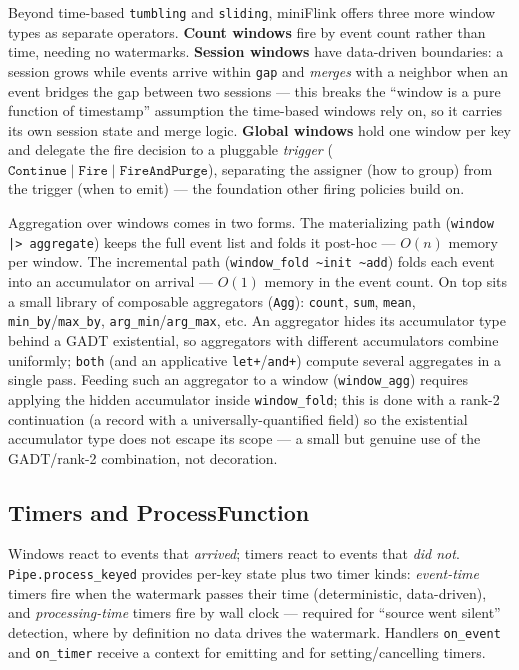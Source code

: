 \documentclass[11pt,a4paper]{article}
\begin{document}
Beyond time-based \texttt{tumbling} and \texttt{sliding}, miniFlink
offers three more window types as separate operators. \textbf{Count
windows} fire by event count rather than time, needing no watermarks.
\textbf{Session windows} have data-driven boundaries: a session grows
while events arrive within \texttt{gap} and \emph{merges} with a
neighbor when an event bridges the gap between two sessions — this
breaks the ``window is a pure function of timestamp'' assumption the
time-based windows rely on, so it carries its own session state and
merge logic. \textbf{Global windows} hold one window per key and
delegate the fire decision to a pluggable \emph{trigger}
($\mathtt{Continue} \mid \mathtt{Fire} \mid \mathtt{FireAndPurge}$),
separating the assigner (how to group) from the trigger (when to emit)
— the foundation other firing policies build on.

Aggregation over windows comes in two forms. The materializing path
(\texttt{window |> aggregate}) keeps the full event list and folds it
post-hoc — $O(n)$ memory per window. The incremental path
(\texttt{window\_fold \textasciitilde{}init \textasciitilde{}add})
folds each event into an accumulator on arrival — $O(1)$ memory in the
event count. On top sits a small library of composable aggregators
(\texttt{Agg}): \texttt{count}, \texttt{sum}, \texttt{mean},
\texttt{min\_by}/\texttt{max\_by}, \texttt{arg\_min}/\texttt{arg\_max},
etc. An aggregator hides its accumulator type behind a GADT
existential, so aggregators with different accumulators combine
uniformly; \texttt{both} (and an applicative \texttt{let+}/\texttt{and+})
compute several aggregates in a single pass. Feeding such an aggregator
to a window (\texttt{window\_agg}) requires applying the hidden
accumulator inside \texttt{window\_fold}; this is done with a rank-2
continuation (a record with a universally-quantified field) so the
existential accumulator type does not escape its scope — a small but
genuine use of the GADT/rank-2 combination, not decoration.

\subsection{Timers and ProcessFunction}

Windows react to events that \emph{arrived}; timers react to events
that \emph{did not}. \texttt{Pipe.process\_keyed} provides per-key
state plus two timer kinds: \emph{event-time} timers fire when the
watermark passes their time (deterministic, data-driven), and
\emph{processing-time} timers fire by wall clock — required for
``source went silent'' detection, where by definition no data drives
the watermark. Handlers \texttt{on\_event} and \texttt{on\_timer}
receive a context for emitting and for setting/cancelling timers.
\end{document}
